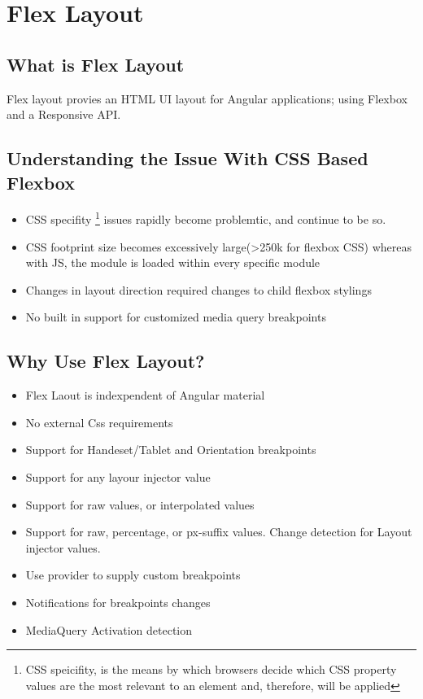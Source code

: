 \maketitle{}
\section{ Flex Layout }


\subsection{ What is Flex Layout }
Flex layout provies an HTML UI layout for Angular applications; using Flexbox
and a Responsive API.

\subsection{ Understanding the Issue With CSS Based Flexbox }
\begin{itemize}
  \item CSS specifity \footnote{CSS speicifity, is the means by which browsers
  decide which CSS property values are the most relevant to an element and,
  therefore, will be applied} issues rapidly become problemtic, and continue
  to be so.
  \item CSS footprint size becomes excessively large(>250k for flexbox CSS)
  whereas with JS, the module is loaded within every specific module
  \item Changes in layout direction required changes to child flexbox stylings
  \item No built in support for customized media query breakpoints 
\end{itemize}

\subsection{ Why Use Flex Layout? }
\begin{itemize}
  \item Flex Laout is indexpendent of Angular material
  \item No external Css requirements
  \item Support for Handeset/Tablet and Orientation breakpoints
  \item Support for any layour injector value
  \item Support for raw values, or interpolated values
  \item Support for raw, percentage, or px-suffix values. Change detection
  for Layout injector values.
  \item Use provider to supply custom breakpoints
  \item Notifications for breakpoints changes
  \item MediaQuery Activation detection
\end{itemize}
